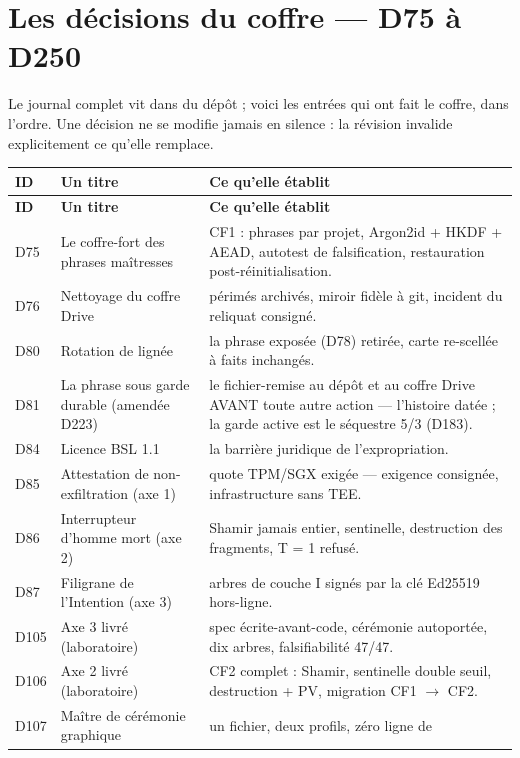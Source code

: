 \section{Les décisions du coffre — D75 à D250}\label{sec:decisionslivre}

Le journal complet vit dans  du dépôt ; voici les entrées qui
ont fait le coffre, dans l'ordre. Une décision ne se modifie jamais en silence : la
révision invalide explicitement ce qu'elle remplace.

\begin{longtable}{@{}p{1.5cm} p{4.6cm} >{\raggedright\arraybackslash}p{9.4cm}@{}}
\toprule
\textbf{ID} & \textbf{Un titre} & \textbf{Ce qu'elle établit} \\
\midrule
\endfirsthead
\toprule
\textbf{ID} & \textbf{Un titre} & \textbf{Ce qu'elle établit} \\
\midrule
\endhead
\bottomrule
\endfoot
D75 & Le coffre-fort des phrases maîtresses & CF1 : phrases par projet, Argon2id +
HKDF + AEAD, autotest de falsification, restauration post-réinitialisation. \\
D76 & Nettoyage du coffre Drive & périmés archivés, miroir fidèle à git, incident du
reliquat consigné. \\
D80 & Rotation de lignée & la phrase exposée (D78) retirée, carte re-scellée à faits
inchangés. \\
D81 & La phrase sous garde durable (amendée D223) & le fichier-remise au
dépôt et au coffre Drive AVANT toute autre action — l'histoire datée ; la
garde active est le séquestre 5/3 (D183). \\
D84 & Licence BSL 1.1 & la barrière juridique de l'expropriation. \\
D85 & Attestation de non-exfiltration (axe 1) & quote TPM/SGX exigée — exigence
consignée, infrastructure sans TEE. \\
D86 & Interrupteur d'homme mort (axe 2) & Shamir jamais entier, sentinelle,
destruction des fragments, T = 1 refusé. \\
D87 & Filigrane de l'Intention (axe 3) & arbres de couche I signés par la clé Ed25519
hors-ligne. \\
D105 & Axe 3 livré (laboratoire) & spec écrite-avant-code, cérémonie autoportée, dix
arbres, falsifiabilité 47/47. \\
D106 & Axe 2 livré (laboratoire) & CF2 complet : Shamir, sentinelle double seuil,
destruction + PV, migration CF1 $\to$ CF2. \\
D107 & Maître de cérémonie graphique & un fichier, deux profils, zéro ligne de

\end{longtable}
